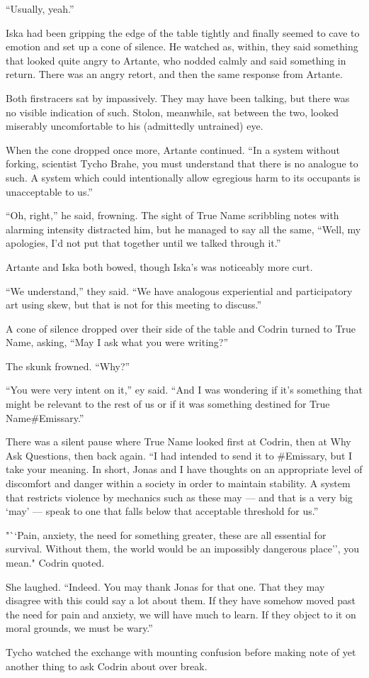 ``Usually, yeah.''

Iska had been gripping the edge of the table tightly and finally seemed to cave to emotion and set up a cone of silence. He watched as, within, they said something that looked quite angry to Artante, who nodded calmly and said something in return. There was an angry retort, and then the same response from Artante.

Both firstracers sat by impassively. They may have been talking, but there was no visible indication of such. Stolon, meanwhile, sat between the two, looked miserably uncomfortable to his (admittedly untrained) eye.

When the cone dropped once more, Artante continued. ``In a system without forking, scientist Tycho Brahe, you must understand that there is no analogue to such. A system which could intentionally allow egregious harm to its occupants is unacceptable to us.''

``Oh, right,'' he said, frowning. The sight of True Name scribbling notes with alarming intensity distracted him, but he managed to say all the same, ``Well, my apologies, I'd not put that together until we talked through it.''

Artante and Iska both bowed, though Iska's was noticeably more curt.

``We understand,'' they said. ``We have analogous experiential and participatory art using skew, but that is not for this meeting to discuss.''

A cone of silence dropped over their side of the table and Codrin turned to True Name, asking, ``May I ask what you were writing?''

The skunk frowned. ``Why?''

``You were very intent on it,'' ey said. ``And I was wondering if it's something that might be relevant to the rest of us or if it was something destined for True Name\#Emissary.''

There was a silent pause where True Name looked first at Codrin, then at Why Ask Questions, then back again. ``I had intended to send it to \#Emissary, but I take your meaning. In short, Jonas and I have thoughts on an appropriate level of discomfort and danger within a society in order to maintain stability. A system that restricts violence by mechanics such as these may — and that is a very big `may' — speak to one that falls below that acceptable threshold for us.''

"``Pain, anxiety, the need for something greater, these are all essential for survival. Without them, the world would be an impossibly dangerous place'', you mean." Codrin quoted.

She laughed. ``Indeed. You may thank Jonas for that one. That they may disagree with this could say a lot about them. If they have somehow moved past the need for pain and anxiety, we will have much to learn. If they object to it on moral grounds, we must be wary.''

Tycho watched the exchange with mounting confusion before making note of yet another thing to ask Codrin about over break.
